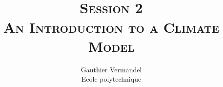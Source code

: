 \documentclass[xcolor=x11names,compress,aspectratio=169]{beamer}%
\begin{document}
%
\title[\SHORTNAME]{
\textsc{\footnotesize\SHORTNAME\\ Session 2\\[0.35em] \Large An Introduction to a Climate Model}
\\
}
\author{ Gauthier Vermandel\\
{\footnotesize Ecole polytechnique}}
\date{}%
%

\begin{frame}%
%

\maketitle
%

\transboxout
\end{frame}%
%
\end{document}
